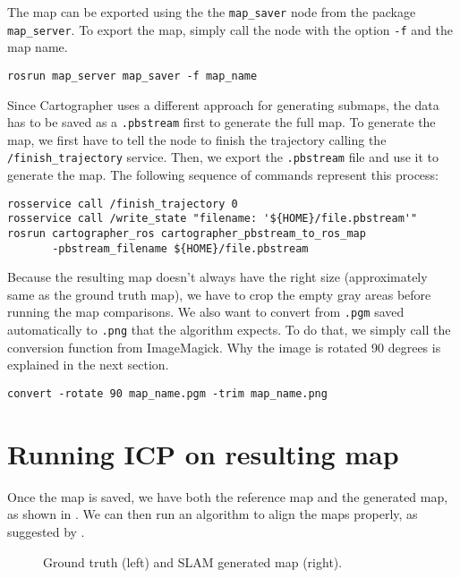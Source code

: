 The map can be exported using the the \texttt{map\_saver} node from the package \texttt{map\_server}. To export the map, simply call the node with the option \texttt{-f} and the map name.

\begin{verbatim}
rosrun map_server map_saver -f map_name
\end{verbatim}

Since Cartographer uses a different approach for generating submaps, the data has to be saved as a \texttt{.pbstream} first to generate the full map. To generate the map, we first have to tell the node to finish the trajectory calling the \texttt{/finish\_trajectory} service. Then, we export the \texttt{.pbstream} file and use it to generate the map. The following sequence of commands represent this process:

\begin{verbatim}
rosservice call /finish_trajectory 0
rosservice call /write_state "filename: '${HOME}/file.pbstream'"
rosrun cartographer_ros cartographer_pbstream_to_ros_map 
       -pbstream_filename ${HOME}/file.pbstream
\end{verbatim}

Because the resulting map doesn't always have the right size (approximately same as the ground truth map), we have to crop the empty gray areas before running the map comparisons. We also want to convert from \texttt{.pgm} saved automatically to \texttt{.png} that the algorithm expects. To do that, we simply call the conversion function from ImageMagick. Why the image is rotated 90 degrees is explained in the next section.

\begin{verbatim}
convert -rotate 90 map_name.pgm -trim map_name.png
\end{verbatim}

\section{Running ICP on resulting map}

Once the map is saved, we have both the reference map and the generated map, as shown in . We can then run an algorithm to align the maps properly, as suggested by \citeauthor{santos2013evaluation}.

\begin{figure}[!ht]
     \centering
     \hspace{2cm}
     \caption{Ground truth (left) and SLAM generated map (right).}
     \label{fig:reference_map_icp}
\end{figure}

